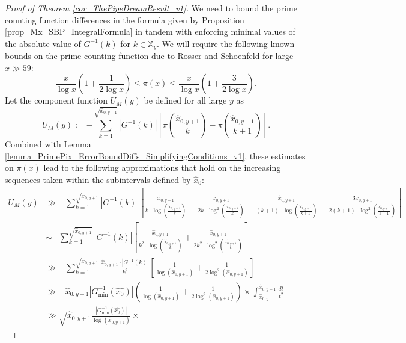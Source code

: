 \documentclass[11pt,reqno,a4letter]{article}
\numberwithin{figure}{section}
\numberwithin{table}{section}
\theoremstyle{plain}
\numberwithin{theorem}{section}
\theoremstyle{definition}
\begin{document}
\begin{proof}[Proof of Theorem \ref{cor_ThePipeDreamResult_v1}]
We need to bound the prime counting function differences in the formula given by 
Proposition \ref{prop_Mx_SBP_IntegralFormula} in tandem with enforcing minimal values of the 
absolute value of $G^{-1}(k)$ for $k \in \mathbb{X}_y$. 
We will require the following known bounds on the prime counting 
function due to Rosser and Schoenfeld \cite[Thm.\ 1]{ROSSER-SCHOENFELD-1962} 
for large $x \gg 59$: 
\begin{equation} 
\label{eqn_RosserSchoenfeld_PrimePixBounds_v2} 
\frac{x}{\log x}\left(1 + \frac{1}{2\log x}\right) \leq \pi(x) \leq 
     \frac{x}{\log x}\left(1 + \frac{3}{2 \log x}\right). 
\end{equation} 
Let the component function $U_M(y)$ be defined for all large $y$ as 
\[
U_M(y) := -\sum_{k=1}^{\sqrt{\hat{x}_{0,y+1}}} |G^{-1}(k)| \left[ 
     \pi\left(\frac{\hat{x}_{0,y+1}}{k}\right) - 
     \pi\left(\frac{\hat{x}_{0,y+1}}{k+1}\right)
     \right]. 
\]
Combined with Lemma \ref{lemma_PrimePix_ErrorBoundDiffs_SimplifyingConditions_v1}, 
these estimates on $\pi(x)$ lead to the following approximations that hold on the 
increasing sequences taken within the subintervals defined by $\widehat{x}_0$: 
\begin{align*} 
U_M(y) & \gg -\sum_{k=1}^{\sqrt{\hat{x}_{0,y+1}}} |G^{-1}(k)| \left[ 
     \frac{\hat{x}_{0,y+1}}{k \cdot \log\left(\frac{\hat{x}_{0,y+1}}{k}\right)} + 
     \frac{\hat{x}_{0,y+1}}{2k \cdot \log^2\left(\frac{\hat{x}_{0,y+1}}{k}\right)} - 
     \frac{\hat{x}_{0,y+1}}{(k+1) \cdot \log\left(\frac{\hat{x}_{0,y+1}}{k+1}\right)} - 
     \frac{3 \hat{x}_{0,y+1}}{2(k+1) \cdot \log^2\left(\frac{\hat{x}_{0,y+1}}{k+1}\right)}
     \right] \\ 
     & \sim 
     -\sum_{k=1}^{\sqrt{\hat{x}_{0,y+1}}} |G^{-1}(k)| \left[ 
     \frac{\hat{x}_{0,y+1}}{k^2 \cdot \log\left(\frac{\hat{x}_{0,y+1}}{k}\right)} + 
     \frac{\hat{x}_{0,y+1}}{2 k^2 \cdot \log^2\left(\frac{\hat{x}_{0,y+1}}{k}\right)} 
     \right] \\ 
     & \gg -\sum_{k=1}^{\sqrt{\hat{x}_{0,y+1}}} \frac{\hat{x}_{0,y+1} \cdot |G^{-1}(k)|}{k^2} \left[ 
     \frac{1}{\log(\hat{x}_{0,y+1})} + \frac{1}{2 \log^2(\hat{x}_{0,y+1})}\right] \\ 
     & \gg -\hat{x}_{0,y+1} |G_{\min}^{-1}(\hat{x_0})| \left(\frac{1}{\log(\hat{x}_{0,y+1})} + 
     \frac{1}{2 \log^2(\hat{x}_{0,y+1})}\right) \times \int_{\hat{x}_{0,y}}^{\hat{x}_{0,y+1}} 
     \frac{dt}{t^2} \\ 
     & \gg \sqrt{\hat{x}_{0,y+1}} \frac{|G_{\min}^{-1}(\hat{x_0})|}{\log(\hat{x}_{0,y+1})} \times 

\end{align*}
\end{proof}
\end{document}
